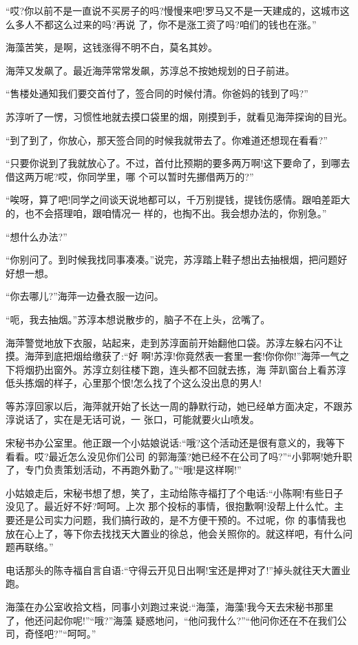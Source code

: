 \documentclass[11pt,a4paper,onecolumn]{article}
\begin{document}
``哎?你以前不是一直说不买房子的吗?慢慢来吧!罗马又不是一天建成的，这城市这么多人不都这么过来的吗?再说
了，你不是涨工资了吗?咱们的钱也在涨。''

海藻苦笑，是啊，这钱涨得不明不白，莫名其妙。

海萍又发飙了。最近海萍常常发飙，苏淳总不按她规划的日子前进。

``售楼处通知我们要交首付了，签合同的时候付清。你爸妈的钱到了吗?''

苏淳听了一愣，习惯性地就去摸口袋里的烟，刚摸到手，就看见海萍探询的目光。

``到了到了，你放心，那天签合同的时候我就带去了。你难道还想现在看看?''

``只要你说到了我就放心了。不过，首付比预期的要多两万啊!这下要命了，到哪去借这两万呢?哎，你同学里，哪
个可以暂时先挪借两万的?''

``唉呀，算了吧!同学之间谈天说地都可以，千万别提钱，提钱伤感情。跟咱差距大的，也不会搭理咱，跟咱情况一
样的，也掏不出。我会想办法的，你别急。''

``想什么办法?''

``你别问了。到时候我找同事凑凑。''说完，苏淳踏上鞋子想出去抽根烟，把问题好好想一想。

``你去哪儿?''海萍一边叠衣服一边问。

``呃，我去抽烟。''苏淳本想说散步的，脑子不在上头，岔嘴了。

海萍警觉地放下衣服，站起来，走到苏淳面前开始翻他口袋。苏淳左躲右闪不让摸。海萍到底把烟给缴获了:``好
啊!苏淳!你竟然表一套里一套!你你你!''海萍一气之下将烟扔出窗外。苏淳立刻往楼下跑，连头都不回就去拣，海
萍趴窗台上看苏淳低头拣烟的样子，心里那个恨!怎么找了个这么没出息的男人!

等苏淳回家以后，海萍就开始了长达一周的静默行动，她已经单方面决定，不跟苏淳说话了，实在是无话可说，一
张口，可能就要火山喷发。

宋秘书办公室里。他正跟一个小姑娘说话:``哦?这个活动还是很有意义的，我等下看看。哎?最近怎么没见你们公司
的郭海藻?她已经不在公司了吗?''``小郭啊!她升职了，专门负责策划活动，不再跑外勤了。''``哦!是这样啊!''

小姑娘走后，宋秘书想了想，笑了，主动给陈寺福打了个电话:``小陈啊!有些日子没见了。最近好不好?呵呵。上次
那个投标的事情，很抱歉啊!没帮上什么忙。主要还是公司实力问题，我们搞行政的，是不方便干预的。不过呢，你
的事情我也放在心上了，等下你去找找天大置业的徐总，他会关照你的。就这样吧，有什么问题再联络。''

电话那头的陈寺福自言自语:``守得云开见日出啊!宝还是押对了!''掉头就往天大置业跑。

海藻在办公室收拾文档，同事小刘跑过来说:``海藻，海藻!我今天去宋秘书那里了，他还问起你呢!''``哦?''海藻
疑惑地问，``他问我什么?''``他问你还在不在我们公司，奇怪吧?''``呵呵。''
\end{document}

